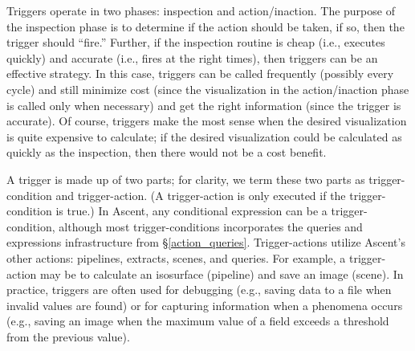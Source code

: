 Triggers operate in two phases: inspection and action/inaction.
%
The purpose of the inspection phase is to determine if the action should be taken, if so, then
the trigger should ``fire.''
%
Further, if the inspection routine is cheap (i.e., executes quickly) and accurate (i.e.,
fires at the right times), then
triggers can be an effective strategy.
%
In this case, triggers can be called frequently (possibly every cycle) and still minimize cost
(since the visualization in the action/inaction phase is called only when necessary) and
get the right information (since the trigger is accurate).
%
Of course, triggers make the most sense when the desired visualization is quite expensive
to calculate;
if the desired visualization could be calculated as quickly as the inspection, then there would
not be a cost benefit.





%
%
%
%

A trigger is made up of two parts; for clarity, we term these two parts 
as trigger-condition and trigger-action.
(A trigger-action is only executed if the trigger-condition is true.)
%
In Ascent, any conditional expression can be a trigger-condition, although most trigger-conditions
incorporates the queries and expressions infrastructure from
\S\ref{action_queries}.
%
Trigger-actions utilize Ascent's other actions: pipelines, extracts, scenes, and
queries.  
%
For example, a trigger-action may be to calculate an isosurface (pipeline) and save
an image (scene).
%
In practice, triggers are often used for debugging (e.g., saving data to
a file when invalid values are found) or 
for capturing information when a phenomena occurs
(e.g., saving an image when the maximum value of a field exceeds a threshold from the
previous value).
%

